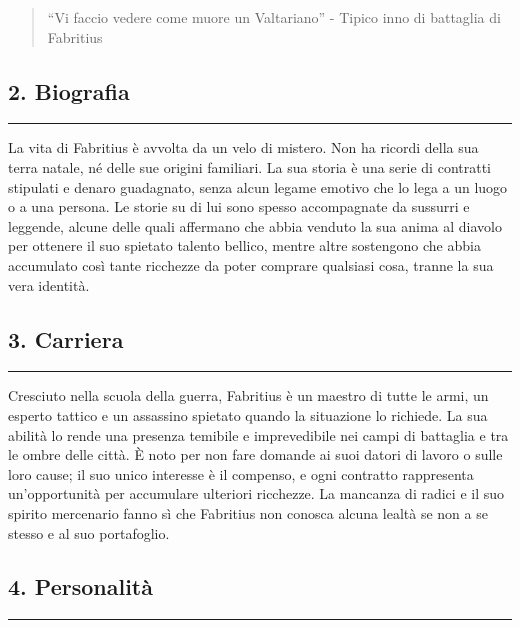 \begin{quote}
``Vi faccio vedere come muore un Valtariano'' - Tipico inno di battaglia
di Fabritius
\end{quote}

\subsection{2. Biografia}\label{biografia}

\begin{center}\rule{0.5\linewidth}{0.5pt}\end{center}

La vita di Fabritius è avvolta da un velo di mistero. Non ha ricordi
della sua terra natale, né delle sue origini familiari. La sua storia è
una serie di contratti stipulati e denaro guadagnato, senza alcun legame
emotivo che lo lega a un luogo o a una persona. Le storie su di lui sono
spesso accompagnate da sussurri e leggende, alcune delle quali affermano
che abbia venduto la sua anima al diavolo per ottenere il suo spietato
talento bellico, mentre altre sostengono che abbia accumulato così tante
ricchezze da poter comprare qualsiasi cosa, tranne la sua vera identità.

\subsection{3. Carriera}\label{carriera}

\begin{center}\rule{0.5\linewidth}{0.5pt}\end{center}

Cresciuto nella scuola della guerra, Fabritius è un maestro di tutte le
armi, un esperto tattico e un assassino spietato quando la situazione lo
richiede. La sua abilità lo rende una presenza temibile e imprevedibile
nei campi di battaglia e tra le ombre delle città. È noto per non fare
domande ai suoi datori di lavoro o sulle loro cause; il suo unico
interesse è il compenso, e ogni contratto rappresenta un'opportunità per
accumulare ulteriori ricchezze. La mancanza di radici e il suo spirito
mercenario fanno sì che Fabritius non conosca alcuna lealtà se non a se
stesso e al suo portafoglio.

\subsection{4. Personalità}\label{personalituxe0}

\begin{center}\rule{0.5\linewidth}{0.5pt}\end{center}

